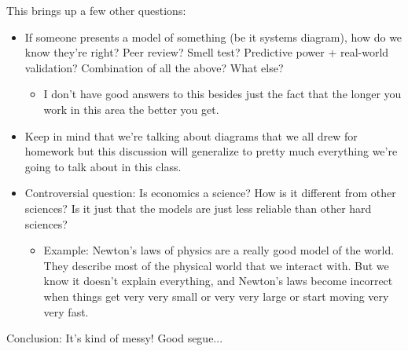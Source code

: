 \documentclass[11pt]{article}
\begin{document}
This brings up a few other questions:
\begin{itemize}
    \item If someone presents a model of something (be it systems diagram), how do we know they're right? Peer review? Smell test? Predictive power + real-world validation? Combination of all the above? What else?
    \begin{itemize}
        \item I don't have good answers to this besides just the fact that the longer you work in this area the better you get.  
    \end{itemize}
    \item Keep in mind that we're talking about diagrams that we all drew for homework but this discussion will generalize to pretty much everything we're going to talk about in this class. 
    \item Controversial question: Is economics a science? How is it different from other sciences? Is it just that the models are just less reliable than other hard sciences? 
    \begin{itemize}
        \item Example: Newton's laws of physics are a really good model of the world. They describe most of the physical world that we interact with. But we know it doesn't explain everything, and Newton's laws become incorrect when things get very very small or very very large or start moving very very fast. 
    \end{itemize}
\end{itemize}


Conclusion: It's kind of messy! Good segue...



\end{document}
